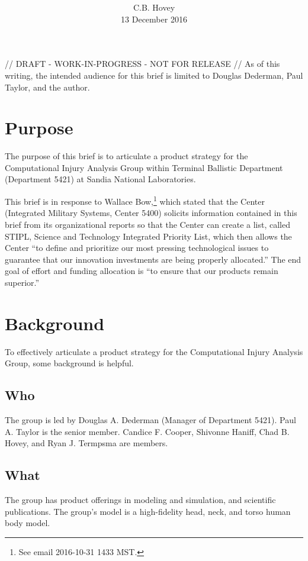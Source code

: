 \documentclass[12pt,reqno]{amsart}
\title{\bfseries \cbhTitleBreak}
\author{C.B. Hovey \\ \tiny 13 December 2016}
\begin{document}
{\abstract
// DRAFT - WORK-IN-PROGRESS - NOT FOR RELEASE //
As of this writing, the intended audience for this brief is limited to 
Douglas Dederman, Paul Taylor, and the author.
}

\maketitle


\section{Purpose}
The purpose of this brief is to articulate a product strategy for the 
Computational Injury Analysis Group within Terminal Ballistic Department 
(Department 5421) at Sandia National Laboratories.                                                                              

This brief is in response to Wallace 
Bow,\footnote{See email 2016-10-31 1433 MST.}
which stated that the Center (Integrated Military Systems, Center 5400) 
solicits information contained in this brief from its organizational reports 
so that the Center can create a list, called STIPL, Science and Technology 
Integrated Priority List, which then allows the Center ``to define and 
prioritize our most pressing technological issues to guarantee that our 
innovation investments are being properly allocated.''  The end goal of 
effort and funding allocation is ``to ensure that our products 
remain superior.''

\section{Background}
\label{section:background}
To effectively articulate a product strategy for the 
Computational Injury Analysis Group, some background is helpful.  

\subsection{Who}
The group is led by Douglas A. Dederman (Manager of Department 5421).  
Paul A. Taylor is the senior member.  
Candice F. Cooper, Shivonne Haniff, Chad B. Hovey, 
and Ryan J. Termpsma are members. 

\subsection{What}
The group has product offerings in modeling and simulation, 
and scientific publications.  The group's model is a high-fidelity 
head, neck, and torso human body model.
\end{document}
